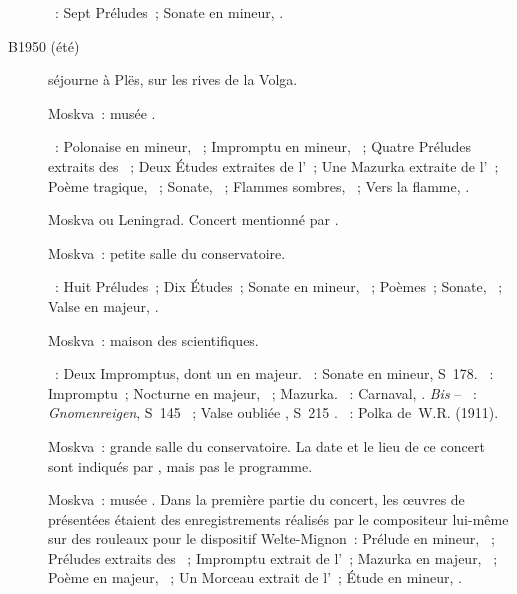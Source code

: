 \begin{description}
 \textsc{\Scriabine{}}~: Sept Préludes~; Sonate en \kF \Sharp mineur,
 .
 \item[B1950 (été)]
 \VSofronitsky{} séjourne à Plës, sur les rives de la Volga.
 \item[\DateWithWeekDay{1950-09-28}]
 Moskva~: musée \Scriabine{}.

 \textsc{\Scriabine{}}~: Polonaise en \kB \Flat mineur, ~;
 Impromptu en \kB \Flat mineur,  ~; Quatre Préludes
 extraits des ~; Deux Études extraites de l'~; Une
 Mazurka extraite de l'~; Poème tragique, ~; Sonate,
 ~; Flammes sombres,  ~; Vers la flamme,
 .
 \item[\DateWithWeekDay{1950-10-05}]
 Moskva ou Leningrad.
 Concert mentionné par \citet[p.~171]{Nekrasova08}.
 \item[\DateWithWeekDay{1950-10-19}]
 Moskva~: petite salle du conservatoire.

 \textsc{\Scriabine{}}~: Huit Préludes~; Dix Études~; Sonate en \kF \Sharp
 mineur, ~; Poèmes~; Sonate, ~; Valse en \kA \Flat majeur,
 .
 \item[\DateWithWeekDay{1950-10-29}]
 Moskva~: maison des scientifiques.

 \textsc{\Schubert{}}~: Deux Impromptus, dont un en \kA \Flat majeur.
 \textsc{\Liszt{}}~: Sonate en \kB mineur, S~178.
 \textsc{\Chopin{}}~: Impromptu~; Nocturne en \kF \Sharp majeur, 
 ~; Mazurka.
 \textsc{\Schumann{}}~: Carnaval, .
 \emph{Bis} -- \textsc{\Liszt{}}~: \emph{Gnomenreigen}, S~145 ~;
 Valse oubliée , S~215 .
 \textsc{\Rachmaninov{}}~: Polka de~W.R. (1911).
 \item[\DateWithWeekDay{1950-11-26}]
 Moskva~: grande salle du conservatoire.
 La date et le lieu de ce concert sont indiqués par \ASofronitsky{}, mais
 pas le programme.
 \item[\DateWithWeekDay{1950-12-05}]
 Moskva~: musée \Scriabine{}.
 Dans la première partie du concert, les œuvres de \Scriabine{} présentées
 étaient des enregistrements réalisés par le compositeur lui-même sur des
 rouleaux pour le dispositif Welte-Mignon~: Prélude en \kG \Sharp mineur,
  ~; Préludes extraits des ~; Impromptu
 extrait de l'~; Mazurka en \kF \Sharp majeur, 
 ~; Poème en \kF \Sharp majeur,  ~; Un Morceau
 extrait de l'~; Étude en \kD \Sharp mineur,  .


\end{description}
